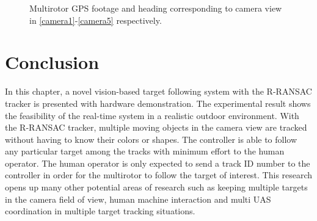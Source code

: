 \begin{figure}[htbp]
	\centering
	\caption{Multirotor GPS footage and heading corresponding to camera view in \ref{camera1}-\ref{camera5} respectively.}
	\label{gps}
\end{figure}

\section{Conclusion}
In this chapter, a novel vision-based target following system with the R-RANSAC tracker is presented with hardware demonstration. The experimental result shows the feasibility of the real-time system in a realistic outdoor environment. With the R-RANSAC tracker, multiple moving objects in the camera view are tracked without having to know their colors or shapes. The controller is able to follow any particular target among the tracks with minimum effort to the human operator. The human operator is only expected to send a track ID number to the controller in order for the multirotor to follow the target of interest. This research opens up many other potential areas of research such as keeping multiple targets in the camera field of view, human machine interaction and multi UAS coordination in multiple target tracking situations.